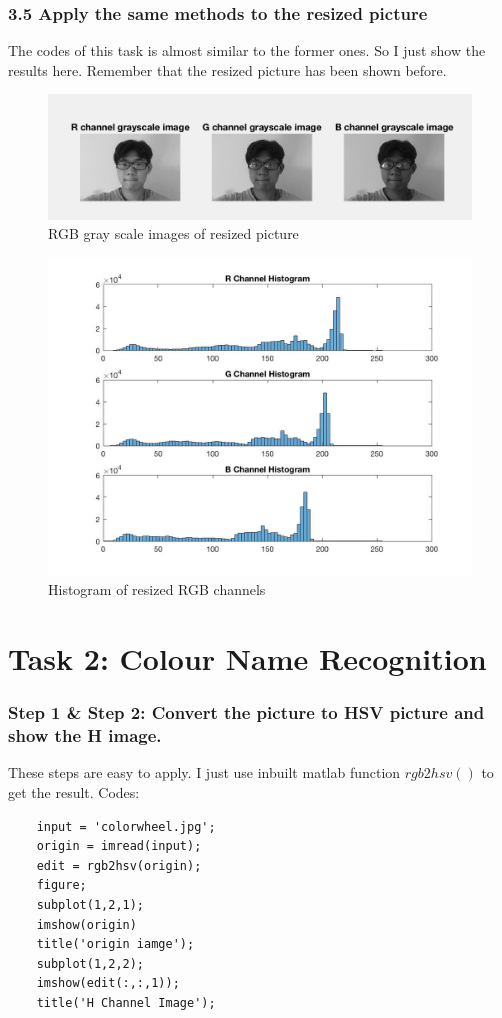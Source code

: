 \documentclass{article}
\begin{document}
\subsubsection*{3.5 Apply the same methods to the resized picture}
The codes of this task is almost similar to the former ones. So I just show the results here. Remember that the resized picture has been shown before.
\begin{figure}[htbp]
    \centering
    \includegraphics[scale = 0.6]{fig4.jpg}
    \caption{RGB gray scale images of resized picture}
    \label{fig4}
\end{figure}
\begin{figure}[htbp]
    \centering
    \includegraphics[scale = 0.3]{fig5.jpg}
    \caption{Histogram of resized RGB channels}
    \label{fig5}
\end{figure}



\section{Task 2: Colour Name Recognition}
\subsubsection*{Step 1 \& Step 2: Convert the picture to HSV picture and show the H image.}
These steps are easy to apply. I just use inbuilt matlab function $rgb2hsv()$ to get the result.
Codes:
\begin{lstlisting}
    input = 'colorwheel.jpg';
    origin = imread(input);
    edit = rgb2hsv(origin);
    figure;
    subplot(1,2,1);
    imshow(origin)
    title('origin iamge');
    subplot(1,2,2);
    imshow(edit(:,:,1));
    title('H Channel Image');
\end{lstlisting}
\end{document}
